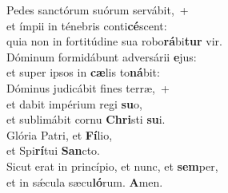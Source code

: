 \evenverse Pedes sanctórum suórum servábit,~+\\
\evenverse  et ímpii in ténebris conti\textbf{cé}scent:~\*\\
\evenverse quia non in fortitúdine sua robo\textbf{rá}bi\textbf{tur} vir.\\
\oddverse Dóminum formidábunt adversárii \textbf{e}jus:~\*\\
\oddverse et super ipsos in \textbf{cæ}lis to\textbf{ná}bit:\\
\evenverse Dóminus judicábit fines terræ,~+\\
\evenverse  et dabit impérium regi \textbf{su}o,~\*\\
\evenverse et sublimábit cornu \textbf{Chri}sti \textbf{su}i.\\
\oddverse Glória Patri, et \textbf{Fí}lio,~\*\\
\oddverse et Spi\textbf{rí}tui \textbf{San}cto.\\
\evenverse Sicut erat in princípio, et nunc, et \textbf{sem}per,~\*\\
\evenverse et in sǽcula sæcu\textbf{ló}rum. \textbf{A}men.\\
